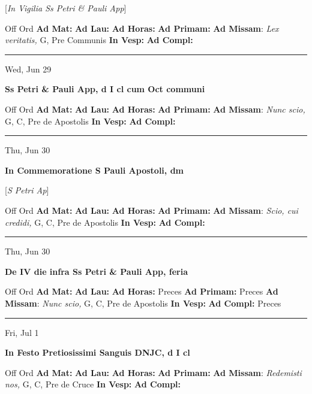 \documentclass[letterpaper, 10pt]{article}
\begin{document}
[\textit{In Vigilia Ss Petri \& Pauli App}]
\begin{justify}
Off Ord
\textbf{Ad Mat: }
\textbf{Ad Lau: }
\textbf{Ad Horas: }
\textbf{Ad Primam: }
\textbf{Ad Missam}: \textit{Lex veritatis,} G, Pre Communis
\textbf{In Vesp: }
\textbf{Ad Compl: }\end{justify}



\hrule
\begin{center}
Wed, Jun 29
\end{center}\textbf{ \large Ss Petri \& Pauli App, \textnormal{\normalsize d I cl cum Oct communi}}
\begin{justify}
Off Ord
\textbf{Ad Mat: }
\textbf{Ad Lau: }
\textbf{Ad Horas: }
\textbf{Ad Primam: }
\textbf{Ad Missam}: \textit{Nunc scio,} G, C, Pre de Apostolis
\textbf{In Vesp: }
\textbf{Ad Compl: }\end{justify}



\hrule
\begin{center}
Thu, Jun 30
\end{center}\textbf{ \large In Commemoratione S Pauli Apostoli, \textnormal{\normalsize dm}}

[\textit{S Petri Ap}]
\begin{justify}
Off Ord
\textbf{Ad Mat: }
\textbf{Ad Lau: }
\textbf{Ad Horas: }
\textbf{Ad Primam: }
\textbf{Ad Missam}: \textit{Scio, cui credidi,} G, C, Pre de Apostolis
\textbf{In Vesp: }
\textbf{Ad Compl: }\end{justify}



\hrule
\begin{center}
Thu, Jun 30
\end{center}\textbf{ \large De IV die infra Ss Petri \& Pauli App, \textnormal{\normalsize feria}}
\begin{justify}
Off Ord
\textbf{Ad Mat: }
\textbf{Ad Lau: }
\textbf{Ad Horas: }Preces
\textbf{Ad Primam: }Preces
\textbf{Ad Missam}: \textit{Nunc scio,} G, C, Pre de Apostolis
\textbf{In Vesp: }
\textbf{Ad Compl: }Preces\end{justify}



\hrule
\begin{center}
Fri, Jul 1
\end{center}\textbf{ \large In Festo Pretiosissimi Sanguis DNJC, \textnormal{\normalsize d I cl}}
\begin{justify}
Off Ord
\textbf{Ad Mat: }
\textbf{Ad Lau: }
\textbf{Ad Horas: }
\textbf{Ad Primam: }
\textbf{Ad Missam}: \textit{Redemisti nos,} G, C, Pre de Cruce
\textbf{In Vesp: }
\textbf{Ad Compl: }\end{justify}
\end{document}
